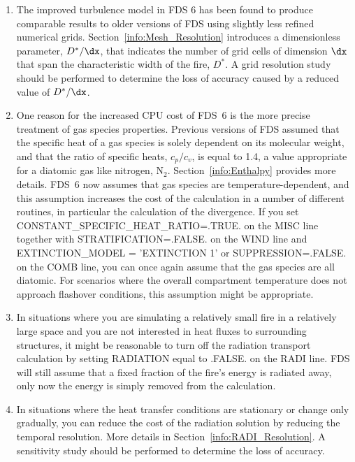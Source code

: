 \documentclass[11pt]{book}
\begin{document}
\begin{enumerate}
\item The improved turbulence model in FDS 6 has been found to produce comparable results to older versions of FDS using slightly less refined numerical grids. Section~\ref{info:Mesh_Resolution} introduces a dimensionless parameter, $D^*/\dx$, that indicates the number of grid cells of dimension $\dx$ that span the characteristic width of the fire, $D^*$. A grid resolution study should be performed to determine the loss of accuracy caused by a reduced value of $D^*/\dx$.
\item One reason for the increased CPU cost of FDS~6 is the more precise treatment of gas species properties. Previous versions of FDS assumed that the specific heat of a gas species is solely dependent on its molecular weight, and that the ratio of specific heats, $c_p/c_v$, is equal to 1.4, a value appropriate for a diatomic gas like nitrogen, N$_2$. Section~\ref{info:Enthalpy} provides more details. FDS~6 now assumes that gas species are temperature-dependent, and this assumption increases the cost of the calculation in a number of different routines, in particular the calculation of the divergence. If you set {\ct CONSTANT\_SPECIFIC\_HEAT\_RATIO=.TRUE.} on the {\ct MISC} line together with {\ct STRATIFICATION=.FALSE.} on the {\ct WIND} line and {\ct EXTINCTION\_MODEL = 'EXTINCTION 1'}  or {\ct SUPPRESSION=.FALSE.} on the {\ct COMB} line, you can once again assume that the gas species are all diatomic. For scenarios where the overall compartment temperature does not approach flashover conditions, this assumption might be appropriate.
\item In situations where you are simulating a relatively small fire in a relatively large space and you are not interested in heat fluxes to surrounding structures, it might be reasonable to turn off the radiation transport calculation by setting {\ct RADIATION} equal to {\ct .FALSE.} on the {\ct RADI} line. FDS will still assume that a fixed fraction of the fire's energy is radiated away, only now the energy is simply removed from the calculation.
\item In situations where the heat transfer conditions are stationary or change only gradually, you can reduce the cost of the radiation solution by reducing the temporal resolution. More details in Section~\ref{info:RADI_Resolution}. A sensitivity study should be performed to determine the loss of accuracy.
\end{enumerate}
\end{document}
